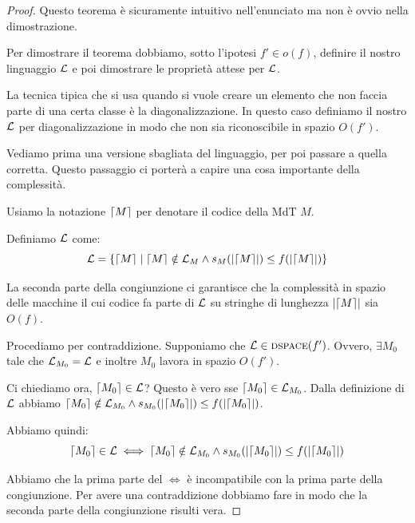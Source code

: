 \begin{proof}
    Questo teorema è sicuramente intuitivo nell'enunciato ma non è ovvio nella dimostrazione.

    Per dimostrare il teorema dobbiamo, sotto l'ipotesi $f' \in o(f)$, definire il nostro linguaggio
    $\mathcal{L}$ e poi dimostrare le proprietà attese per $\mathcal{L}$.


    La tecnica tipica che si usa quando si vuole creare un elemento che non faccia parte di una
    certa classe è la diagonalizzazione. In questo caso definiamo il nostro $\mathcal{L}$ per
    diagonalizzazione in modo che non sia riconoscibile in spazio $O(f')$.

    Vediamo prima una versione sbagliata del linguaggio, per poi passare a quella corretta. Questo
    passaggio ci porterà a capire una cosa importante della complessità.

    Usiamo la notazione $\lceil M \rceil$ per denotare il codice della MdT $M$.

    Definiamo $\mathcal{L}$ come:
    \begin{equation*}
        \mathcal{L} = \left\{\lceil M \rceil \mid \lceil M \rceil \notin \mathcal{L}_{M} \land s_{M}(|\lceil M \rceil|) \leq f(|\lceil M \rceil|)\right\}
    \end{equation*}

    La seconda parte della congiunzione ci garantisce che la complessità in spazio delle macchine
    il cui codice fa parte di $\mathcal{L}$ su stringhe di lunghezza $|\lceil M \rceil|$ sia $O(f)$.

    Procediamo per contraddizione. Supponiamo che $\mathcal{L} \in \textsc{dspace}(f')$. Ovvero, $\exists M_{0}$ tale
    che $\mathcal{L}_{M_{0}} = \mathcal{L}$ e inoltre $M_{0}$ lavora in spazio $O(f')$.

    Ci chiediamo ora, $\lceil M_{0} \rceil \in \mathcal{L}$? Questo è vero sse $\lceil M_{0} \rceil \in \mathcal{L}_{M_{0}}$.
    Dalla definizione di $\mathcal{L}$ abbiamo $\lceil M_{0} \rceil \notin \mathcal{L}_{M_{0}} \land
    s_{M_{0}}(|\lceil M_{0} \rceil|) \leq f(|\lceil M_{0} \rceil|)$. 

    Abbiamo quindi:
    \begin{equation*}
        \lceil M_{0} \rceil \in \mathcal{L} \iff \lceil M_{0} \rceil \notin \mathcal{L}_{M_{0}} \land s_{M_{0}}(|\lceil M_{0} \rceil|)
        \leq f(|\lceil M_{0} \rceil|)
    \end{equation*}

    Abbiamo che la prima parte del $\iff$ è incompatibile con la prima parte della congiunzione.
    Per avere una contraddizione dobbiamo fare in modo che la seconda parte della congiunzione
    risulti vera.


\end{proof}
